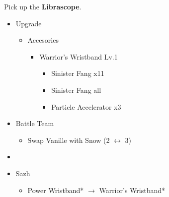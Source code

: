 Pick up the \textbf{Librascope}.

\begin{upgrade}
	\begin{itemize}
		\item Upgrade
			\begin{itemize}
				\item Accesories
					\begin{itemize}
						\item Warrior's Wristband Lv.1
							\begin{itemize}
								\item Sinister Fang x11
								\item Sinister Fang all
								\item Particle Accelerator x3
							\end{itemize}
					\end{itemize}
			\end{itemize}
	\end{itemize}
\end{upgrade}

\begin{menu}
	\begin{itemize}
		\paradigm
		\begin{itemize}
			\item Battle Team
				\begin{itemize}
					\item Swap Vanille with Snow (2 $\leftrightarrow$ 3)
				\end{itemize}
			\item {}%
				  {\paradigmline{\syn}{(\sen)}{(\rav)}}%
			      {\paradigmline[4]{\com}{\rav}{\rav}}%
			      {\paradigmline{(\rav)}{(\sen)}{(\rav)}}%
			      {\paradigmline{\com}{\com}{\rav}}%
			      {\paradigmline{\rav}{(\sen)}{\sab}}%
			      {\paradigmline{\com}{\com}{(\rav)}}%
		\end{itemize}
		\equip
		\begin{itemize}
			\item Sazh
				\begin{itemize}
					\item Power Wristband* $\rightarrow$ Warrior's Wristband*
				\end{itemize}
		\end{itemize}
	\end{itemize}
\end{menu}

\renewcommand{\first}{[1] Riot Shield (\syn/\sen/\rav)}
\renewcommand{\third}{[3] Mystic Tower (\rav/\sen/\rav)}
\renewcommand{\fourth}{[4] Aggression (\com/\com/\rav)}
\renewcommand{\fifth}{[5] Matador (\rav/\sen/\sab)}
\renewcommand{\sixth}{[6] Aggression (\com/\com/\rav)}

